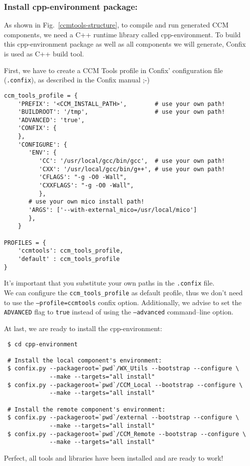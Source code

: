 \subsubsection{Install cpp-environment package:}
As shown in Fig.~\ref{ccmtools-structure}, to compile and run generated CCM
components, we need a C++ runtime library called cpp-environment.
To build this cpp-environment package as well as all components we will generate,
Confix is used as C++ build tool. 

First, we have to create a CCM Tools profile in Confix' configuration file
({\tt .confix}), as described in the Confix manual ;-)
\begin{small}
\begin{verbatim}
ccm_tools_profile = {
    'PREFIX': '<CCM_INSTALL_PATH>',        # use your own path!
    'BUILDROOT': '/tmp',                   # use your own path!
    'ADVANCED': 'true',
    'CONFIX': {
    },
    'CONFIGURE': {
       'ENV': {
          'CC': '/usr/local/gcc/bin/gcc',  # use your own path!
          'CXX': '/usr/local/gcc/bin/g++', # use your own path!    
          'CFLAGS': "-g -O0 -Wall",
          'CXXFLAGS': "-g -O0 -Wall",
          },
       # use your own mico install path!
       'ARGS': ['--with-external_mico=/usr/local/mico']
       },
    }

PROFILES = {
    'ccmtools': ccm_tools_profile,
    'default' : ccm_tools_profile
}
\end{verbatim}
\end{small}
It's important that you substitute your own paths in the {\tt .confix} file. \\
We can configure the {\tt ccm\_tools\_profile} as default profile, thus we don't need to use the {\tt --profile=ccmtools} confix option.
Additionally, we advise to set the {\tt ADVANCED} flag to {\tt true} instead of
using the {\tt --advanced} command--line option. 

At last, we are ready to install the cpp-environment:
\begin{small}
\begin{verbatim}
 $ cd cpp-environment

 # Install the local component's environment:
 $ confix.py --packageroot=`pwd`/WX_Utils --bootstrap --configure \
             --make --targets="all install"
 $ confix.py --packageroot=`pwd`/CCM_Local --bootstrap --configure \
             --make --targets="all install"

 # Install the remote component's environment:
 $ confix.py --packageroot=`pwd`/external --bootstrap --configure \
             --make --targets="all install"
 $ confix.py --packageroot=`pwd`/CCM_Remote --bootstrap --configure \
             --make --targets="all install"
\end{verbatim}
\end{small}

Perfect, all tools and libraries have been installed and are ready to work!





